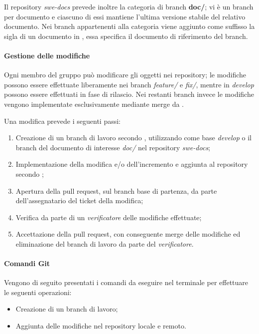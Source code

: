 Il repository \emph{swe-docs} prevede inoltre la categoria di branch \textbf{doc/}; vi è un branch per documento e ciascuno di
essi mantiene l'ultima versione stabile del relativo documento. Nei branch appartenenti alla categoria viene aggiunto come suffisso la
sigla di un documento in , essa specifica il documento di riferimento del branch.

\paragraph{Gestione delle modifiche}
\label{par:gestione_modifiche}
Ogni membro del gruppo può modificare gli oggetti nei repository; le modifiche possono essere effettuate liberamente nei branch
\emph{feature/} e \emph{fix/}, mentre in \emph{develop} possono essere effettuati  in fase di rilascio. Nei restanti
branch invece le modifiche vengono implementate esclusivamente mediante merge da .

Una modifica prevede i seguenti passi:
\begin{enumerate}
	\item Creazione di un branch di lavoro secondo , utilizzando come base \emph{develop} o il
		branch del documento di interesse \emph{doc/} nel repository \emph{swe-docs};
	\item Implementazione della modifica e/o dell'incremento e aggiunta al repository secondo ;
	\item Apertura della pull request, sul branch base di partenza, da parte dell'assegnatario del ticket della modifica;
	\item Verifica da parte di un \emph{verificatore} delle modifiche effettuate;
	\item Accettazione della pull request, con conseguente merge delle modifiche ed eliminazione del branch di lavoro da parte del
		\emph{verificatore}.
\end{enumerate}

\paragraph{Comandi Git}
\label{par:comandi_git}

Vengono di seguito presentati i comandi da eseguire nel terminale per effettuare le seguenti operazioni:
\begin{itemize}
	\item Creazione di un branch di lavoro;
	\item Aggiunta delle modifiche nel repository locale e remoto.
\end{itemize}

